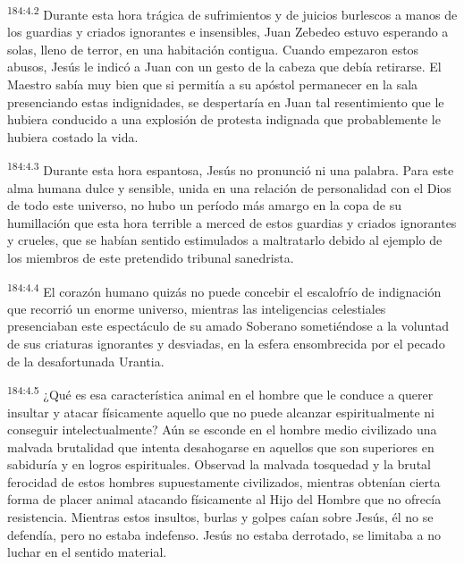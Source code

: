 \par 
\textsuperscript{184:4.2} Durante esta hora trágica de sufrimientos y de juicios burlescos a manos de los guardias y criados ignorantes e insensibles, Juan Zebedeo estuvo esperando a solas, lleno de terror, en una habitación contigua. Cuando empezaron estos abusos, Jesús le indicó a Juan con un gesto de la cabeza que debía retirarse. El Maestro sabía muy bien que si permitía a su apóstol permanecer en la sala presenciando estas indignidades, se despertaría en Juan tal resentimiento que le hubiera conducido a una explosión de protesta indignada que probablemente le hubiera costado la vida.

\par 
\textsuperscript{184:4.3} Durante esta hora espantosa, Jesús no pronunció ni una palabra. Para este alma humana dulce y sensible, unida en una relación de personalidad con el Dios de todo este universo, no hubo un período más amargo en la copa de su humillación que esta hora terrible a merced de estos guardias y criados ignorantes y crueles, que se habían sentido estimulados a maltratarlo debido al ejemplo de los miembros de este pretendido tribunal sanedrista.

\par 
\textsuperscript{184:4.4} El corazón humano quizás no puede concebir el escalofrío de indignación que recorrió un enorme universo, mientras las inteligencias celestiales presenciaban este espectáculo de su amado Soberano sometiéndose a la voluntad de sus criaturas ignorantes y desviadas, en la esfera ensombrecida por el pecado de la desafortunada Urantia.

\par 
\textsuperscript{184:4.5} ¿Qué es esa característica animal en el hombre que le conduce a querer insultar y atacar físicamente aquello que no puede alcanzar espiritualmente ni conseguir intelectualmente? Aún se esconde en el hombre medio civilizado una malvada brutalidad que intenta desahogarse en aquellos que son superiores en sabiduría y en logros espirituales. Observad la malvada tosquedad y la brutal ferocidad de estos hombres supuestamente civilizados, mientras obtenían cierta forma de placer animal atacando físicamente al Hijo del Hombre que no ofrecía resistencia. Mientras estos insultos, burlas y golpes caían sobre Jesús, él no se defendía, pero no estaba indefenso. Jesús no estaba derrotado, se limitaba a no luchar en el sentido material.

